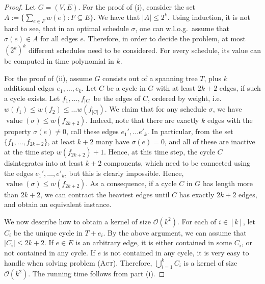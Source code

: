 \documentclass[runningheads]{llncs}
\numberwithin{equation}{section}
\newcommand{\set}[1]{\{ #1 \}}
\newcommand{\fromto}[2]{\set{#1, \ldots, #2}}
\newcommand{\bigO}{\mathcal{O}}
\newcommand{\act}{\textsc{(Act)}}
\DeclareMathOperator{\val}{\text{value}}
\begin{document}
\begin{proof}
Let $G = (V, E)$. For the proof of (i), consider the set $A := \set{\sum_{e \in F}w(e) : F \subseteq E}$. We have that $|A| \leq 2^k$. Using induction, it is not hard to see, that in an optimal schedule $\sigma$, one can w.l.o.g.\ assume that $\sigma(e) \in A$ for all edges $e$. Therefore, in order to decide the problem, at most $(2^k)^k$ different schedules need to be considered. For every schedule, its value can be computed in time polynomial in $k$. 

For the proof of (ii), assume $G$ consists out of a spanning tree $T$, plus $k$ additional edges $e_1, \dots, e_k$. Let $C$ be a cycle in $G$ with at least $2k+2$ edges, if such a cycle exists. Let $f_1, \dots, f_{|C|}$ be the edges of $C$, ordered by weight, i.e.\ $w(f_1) \leq w(f_2) \leq \dots w(f_{|C|})$. We claim that for any schedule $\sigma$, we have $\val(\sigma) \leq w(f_{2k+2})$. Indeed, note that there are exactly $k$ edges with the property $\sigma(e) \neq 0$, call these edges $e_1', \dots e'_k$. In particular, from the set $\fromto{f_1}{f_{2k+2}}$, at least $k+2$ many have $\sigma(e) = 0$, and all of these are inactive at the time step $w(f_{2k+2}) + 1$. Hence, at this time step, the cycle $C$ disintegrates into at least $k+2$ components, which need to be connected using the edges $e_1', \dots, e'_k$, but this is clearly impossible. Hence, $\val(\sigma) \leq w(f_{2k+2})$. As a consequence, if a cycle $C$ in $G$ has length more than $2k+2$, we can contract the heaviest edges until $C$ has exactly $2k+2$ edges, and obtain an equivalent instance.

We now describe how to obtain a kernel of size $\bigO(k^2)$. For each of $i \in [k]$, let $C_i$ be the unique cycle in $T + e_i$. By the above argument, we can assume that $|C_i| \leq 2k+2$. If $e \in E$ is an arbitrary edge, it is either contained in some $C_i$, or not contained in any cycle. If $e$ is not contained in any cycle, it is very easy to handle when solving problem {\act}. Therefore, $\bigcup_{i=1}^k C_i$ is a kernel of size $\bigO(k^2)$. The running time follows from part (i).


\end{proof}
\end{document}
